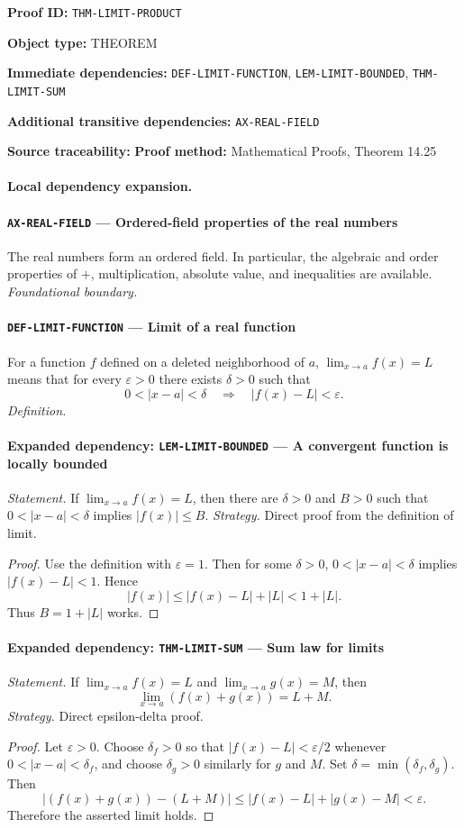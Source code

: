 \documentclass[10pt]{article}
\newcommand{\pidraw}[1]{\begingroup\urlstyle{tt}\nolinkurl{#1}\endgroup}
\theoremstyle{definition}
\theoremstyle{remark}
\newcommand{\meta}[2]{\noindent\textbf{#1:} #2\par}
\begin{document}
\meta{Proof ID}{\pidraw{THM-LIMIT-PRODUCT}}
\meta{Object type}{THEOREM}
\meta{Immediate dependencies}{\pidraw{DEF-LIMIT-FUNCTION}, \pidraw{LEM-LIMIT-BOUNDED}, \pidraw{THM-LIMIT-SUM}}
\meta{Additional transitive dependencies}{\pidraw{AX-REAL-FIELD}}
\meta{Source traceability}{\textbf{Proof method:} Mathematical Proofs, Theorem 14.25}

\paragraph{Local dependency expansion.}

\paragraph{\pidraw{AX-REAL-FIELD} --- Ordered-field properties of the real numbers}
The real numbers form an ordered field. In particular, the algebraic and order properties of $+$, multiplication, absolute value, and inequalities are available.
\textit{Foundational boundary.}

\paragraph{\pidraw{DEF-LIMIT-FUNCTION} --- Limit of a real function}
For a function $f$ defined on a deleted neighborhood of $a$, $\lim_{x\to a}f(x)=L$ means that for every $\varepsilon>0$ there exists $\delta>0$ such that
\[
0<|x-a|<\delta\quad\Longrightarrow\quad |f(x)-L|<\varepsilon.
\]
\textit{Definition.}

\paragraph{Expanded dependency: \pidraw{LEM-LIMIT-BOUNDED} --- A convergent function is locally bounded}
\textit{Statement.} If $\lim_{x\to a}f(x)=L$, then there are $\delta>0$ and $B>0$ such that
$0<|x-a|<\delta$ implies $|f(x)|\le B$.
\textit{Strategy.} Direct proof from the definition of limit.
\begin{proof}Use the definition with $\varepsilon=1$. Then for some $\delta>0$,
$0<|x-a|<\delta$ implies $|f(x)-L|<1$. Hence
\[
|f(x)|\le |f(x)-L|+|L|<1+|L|.
\]
Thus $B=1+|L|$ works.\end{proof}

\paragraph{Expanded dependency: \pidraw{THM-LIMIT-SUM} --- Sum law for limits}
\textit{Statement.} If $\lim_{x\to a}f(x)=L$ and $\lim_{x\to a}g(x)=M$, then
\[
\lim_{x\to a}(f(x)+g(x))=L+M.
\]
\textit{Strategy.} Direct epsilon-delta proof.
\begin{proof}Let $\varepsilon>0$. Choose $\delta_f>0$ so that
$|f(x)-L|<\varepsilon/2$ whenever $0<|x-a|<\delta_f$, and choose
$\delta_g>0$ similarly for $g$ and $M$. Set
$\delta=\min(\delta_f,\delta_g)$. Then
\[
|(f(x)+g(x))-(L+M)|
\le |f(x)-L|+|g(x)-M|<\varepsilon.
\]
Therefore the asserted limit holds.\end{proof}
\end{document}
